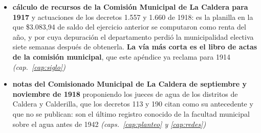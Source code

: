 \begin{itemize}[leftmargin=*]
\item \textbf{cálculo de recursos de la Comisión Municipal de La Caldera para 1917} y actuaciones de los decretos 1.557 y 1.660 de 1918: es la planilla en la que \$3.083,94 de saldo del ejercicio anterior se computaron como renta del año, y por cuya depuración el departamento perdió la municipalidad electiva siete semanas después de obtenerla. \textbf{La vía más corta es el libro de actas de la comisión municipal}, que este apéndice ya reclama para 1914 \textit{(cap.\ \ref{cap:siglo})}
\item \textbf{notas del Comisionado Municipal de La Caldera de septiembre y noviembre de 1918} proponiendo los jueces de agua de los distritos de Caldera y Calderilla, que los decretos 113 y 190 citan como su antecedente y que no se publican: son el último registro conocido de la facultad municipal sobre el agua antes de 1942 \textit{(caps.\ \ref{cap:planteo} y \ref{cap:redes})}


\end{itemize}
